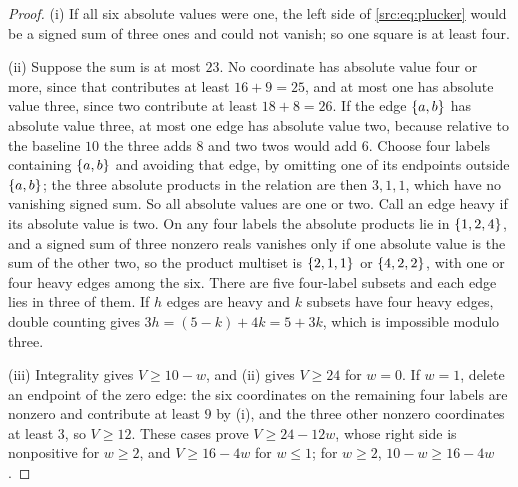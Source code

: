 \begin{proof}
(i) If all six absolute values were one, the left side of \eqref{src:eq:plucker} would be a
signed sum of three ones and could not vanish; so one square is at least four.

(ii) Suppose the sum is at most $23$. No coordinate has absolute value four or more, since
that contributes at least $16+9=25$, and at most one has absolute value three, since two
contribute at least $18+8=26$. If the edge $\{a,b\}$ has absolute value three, at most one
edge has absolute value two, because relative to the baseline $10$ the three adds $8$ and two
twos would add $6$. Choose four labels containing $\{a,b\}$ and avoiding that edge, by
omitting one of its endpoints outside $\{a,b\}$; the three absolute products in the relation
are then $3,1,1$, which have no vanishing signed sum. So all absolute values are one or two.
Call an edge heavy if its absolute value is two. On any four labels the absolute products lie
in $\{1,2,4\}$, and a signed sum of three nonzero reals vanishes only if one absolute value is
the sum of the other two, so the product multiset is $\{2,1,1\}$ or $\{4,2,2\}$, with one or
four heavy edges among the six. There are five four-label subsets and each edge lies in three of
them. If $h$ edges are heavy and $k$ subsets have four heavy edges, double counting gives
$3h=(5-k)+4k=5+3k$, which is impossible modulo three.

(iii) Integrality gives $V\ge10-w$, and (ii) gives $V\ge24$ for $w=0$. If $w=1$, delete an
endpoint of the zero edge: the six coordinates on the remaining four labels are nonzero and
contribute at least $9$ by (i), and the three other nonzero coordinates at least $3$, so
$V\ge12$. These cases prove $V\ge24-12w$, whose right side is nonpositive for $w\ge2$, and
$V\ge16-4w$ for $w\le1$; for $w\ge2$, $10-w\ge16-4w$.
\end{proof}

